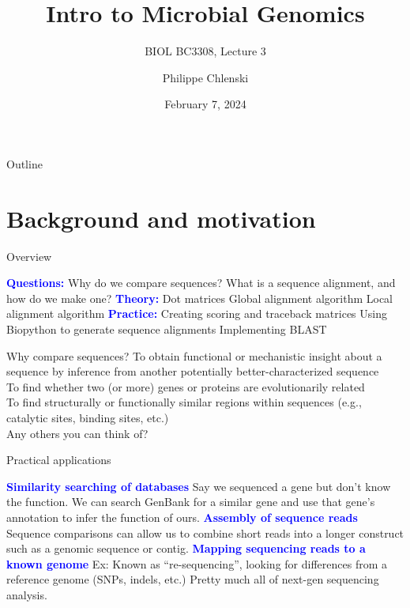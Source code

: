 \documentclass{beamer}
\title{Intro to Microbial Genomics}
\subtitle{BIOL BC3308, Lecture 3}
\author{Philippe Chlenski}
\date{February 7, 2024}
\newcommand{\blu}[1]{\textcolor{blue}{\textbf{#1}}}
\begin{document}
\begin{frame}[plain]
\titlepage
\end{frame}

\begin{frame}{Outline}
\tableofcontents
\end{frame}

\section{Background and motivation}

\begin{frame}{Overview}
\begin{outline}
\1[] \blu{Questions:}
    \2 Why do we compare sequences?
    \2 What is a sequence alignment, and how do we make one?
\1[] \blu{Theory:}
    \2 Dot matrices
    \2 Global alignment algorithm
    \2 Local alignment algorithm
\1[] \blu{Practice:}
    \2 Creating scoring and traceback matrices
    \2 Using Biopython to generate sequence alignments
    \2 Implementing BLAST
\end{outline}
\end{frame}

\begin{frame}{Why compare sequences?}
To obtain functional or mechanistic insight about a sequence by inference from another potentially better-characterized sequence\\
\bigskip
To find whether two (or more) genes or proteins are evolutionarily related\\
\bigskip
To find structurally or functionally similar regions within sequences (e.g., catalytic sites, binding sites, etc.)\\
\bigskip
Any others you can think of?
\end{frame}

\begin{frame}{Practical applications}
\begin{outline}
    \1[] \blu{Similarity searching of databases}
        \2 Say we sequenced a gene but don’t know the function. We can search GenBank for a similar gene and use that gene’s annotation to infer the function of ours.
    \1[] \blu{Assembly of sequence reads}
        \2 Sequence comparisons can allow us to combine short reads into a longer construct such as a genomic sequence or contig.
    \1[] \blu{Mapping sequencing reads to a known genome}
        \2 Ex: Known as “re-sequencing”, looking for differences from a reference genome (SNPs, indels, etc.)
        \2 Pretty much all of next-gen sequencing analysis.
\end{outline}
\end{frame}
\end{document}
